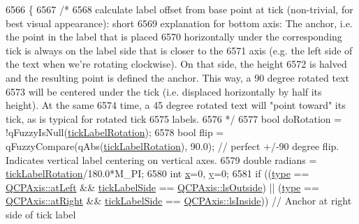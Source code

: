 \begin{DoxyCode}
6566 \{
6567   \textcolor{comment}{/*}
6568 \textcolor{comment}{    calculate label offset from base point at tick (non-trivial, for best visual appearance): short}
6569 \textcolor{comment}{    explanation for bottom axis: The anchor, i.e. the point in the label that is placed}
6570 \textcolor{comment}{    horizontally under the corresponding tick is always on the label side that is closer to the}
6571 \textcolor{comment}{    axis (e.g. the left side of the text when we're rotating clockwise). On that side, the height}
6572 \textcolor{comment}{    is halved and the resulting point is defined the anchor. This way, a 90 degree rotated text}
6573 \textcolor{comment}{    will be centered under the tick (i.e. displaced horizontally by half its height). At the same}
6574 \textcolor{comment}{    time, a 45 degree rotated text will "point toward" its tick, as is typical for rotated tick}
6575 \textcolor{comment}{    labels.}
6576 \textcolor{comment}{  */}
6577   \textcolor{keywordtype}{bool} doRotation = !qFuzzyIsNull(\hyperlink{class_q_c_p_axis_painter_private_ae6ade9232a8e400924009e8edca94bac}{tickLabelRotation});
6578   \textcolor{keywordtype}{bool} flip = qFuzzyCompare(qAbs(\hyperlink{class_q_c_p_axis_painter_private_ae6ade9232a8e400924009e8edca94bac}{tickLabelRotation}), 90.0); \textcolor{comment}{// perfect +/-90 degree flip.
       Indicates vertical label centering on vertical axes.}
6579   \textcolor{keywordtype}{double} radians = \hyperlink{class_q_c_p_axis_painter_private_ae6ade9232a8e400924009e8edca94bac}{tickLabelRotation}/180.0*M\_PI;
6580   \textcolor{keywordtype}{int} \hyperlink{_comparision_pictures_2_createtest_image_8m_a9336ebf25087d91c818ee6e9ec29f8c1}{x}=0, \hyperlink{_comparision_pictures_2_createtest_image_8m_a2fb1c5cf58867b5bbc9a1b145a86f3a0}{y}=0;
6581   \textcolor{keywordflow}{if} ((\hyperlink{class_q_c_p_axis_painter_private_ae04594e97417336933d807c86d353098}{type} == \hyperlink{class_q_c_p_axis_ae2bcc1728b382f10f064612b368bc18aaf84aa6cac6fb6099f54a2cbf7546b730}{QCPAxis::atLeft} && \hyperlink{class_q_c_p_axis_painter_private_a9d27f7625fcfbeb3a60193d0c18fc7e9}{tickLabelSide} == 
      \hyperlink{class_q_c_p_axis_a24b13374b9b8f75f47eed2ea78c37db9a2eadb509fc0c9a8b35b85c86ec9f3c7a}{QCPAxis::lsOutside}) || (\hyperlink{class_q_c_p_axis_painter_private_ae04594e97417336933d807c86d353098}{type} == \hyperlink{class_q_c_p_axis_ae2bcc1728b382f10f064612b368bc18aadf5509f7d29199ef2f263b1dd224b345}{QCPAxis::atRight} && 
      \hyperlink{class_q_c_p_axis_painter_private_a9d27f7625fcfbeb3a60193d0c18fc7e9}{tickLabelSide} == \hyperlink{class_q_c_p_axis_a24b13374b9b8f75f47eed2ea78c37db9aae7b027ac2839cf4ad611df30236fc3f}{QCPAxis::lsInside})) \textcolor{comment}{// Anchor at right side of tick label}

\end{DoxyCode}
